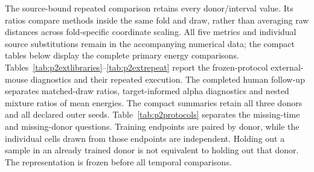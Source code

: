 \supplement
The source-bound repeated comparison retains every donor/interval value. Its ratios compare methods inside the same fold and draw, rather than averaging raw distances across fold-specific coordinate scaling. All five metrics and individual source substitutions remain in the accompanying numerical data; the compact tables below display the complete primary energy comparisons.
{\small\renewcommand{\arraystretch}{1.0}}
\Needspace{215pt}
Tables~\ref{tab:p2extlibraries}--\ref{tab:p2extrepeat} report the frozen-protocol external-mouse diagnostics and their repeated execution.
{\small\renewcommand{\arraystretch}{1.0}}
The completed human follow-up separates matched-draw ratios, target-informed alpha diagnostics and nested mixture ratios of mean energies. The compact summaries retain all three donors and all declared outer seeds.
{\small\renewcommand{\arraystretch}{1.0}}
Table~\ref{tab:p2protocols} separates the missing-time and missing-donor questions. Training endpoints are paired by donor, while the individual cells drawn from those endpoints are independent. Holding out a sample in an already trained donor is not equivalent to holding out that donor. The representation is frozen before all temporal comparisons.
